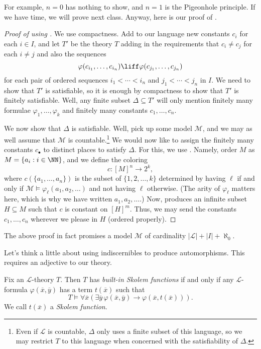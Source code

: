 \documentclass[../notes.tex]{subfiles}
\begin{document}
For example, $n=0$ has nothing to show, and $n=1$ is the Pigeonhole principle. If we have time, we will prove  next class. Anyway, here is our proof of .
\begin{proof}[Proof of  using ]
	We use compactness. Add to our language new constants $c_i$ for each $i\in I$, and let $T'$ be the theory $T$ adding in the requirements that $c_i\ne c_j$ for each $i\ne j$ and also the sequences
	\[\varphi(c_{i_1},\ldots,c_{i_n})\liff\varphi(c_{j_1},\ldots,c_{j_n})\]
	for each pair of ordered sequences $i_1<\cdots<i_n$ and $j_1<\cdots<j_n$ in $I$. We need to show that $T'$ is satisfiable, so it is enough by compactness to show that $T'$ is finitely satisfiable. Well, any finite subset $\Delta\subseteq T'$ will only mention finitely many formulae $\varphi_1,\ldots,\varphi_k$ and finitely many constants $c_1,\ldots,c_n$.

	We now show that $\Delta$ is satisfiable. Well, pick up some model $\mathcal M$, and we may as well assume that $\mathcal M$ is countable.\footnote{Even if $\mathcal L$ is countable, $\Delta$ only uses a finite subset of this language, so we may restrict $T$ to this language when concerned with the satisfiability of $\Delta$.} We would now like to assign the finitely many constants $c_\bullet$ to distinct places to satisfy $\Delta$. For this, we use . Namely, order $M$ as $M=\{a_i:i\in\NN\}$, and we define the coloring
	\[c\colon[M]^n\to 2^k,\]
	where $c(\{a_1,\ldots,a_n\})$ is the subset of $\{1,2,\ldots,k\}$ determined by having $\ell$ if and only if $\mathcal M\models\varphi_\ell(a_1,a_2,\ldots)$ and not having $\ell$ otherwise. (The arity of $\varphi_\ell$ matters here, which is why we have written $a_1,a_2,\ldots$.) Now,  produces an infinite subset $H\subseteq M$ such that $c$ is constant on $[H]^m$. Thus, we may send the constants $c_1,\ldots,c_n$ wherever we please in $H$ (ordered properly).
\end{proof}
\begin{remark}
	The above proof in fact promises a model $\mathcal M$ of cardinality $\left|\mathcal L\right|+\left|I\right|+\aleph_0$.
\end{remark}
Let's think a little about using indiscernibles to produce automorphisms. This requires an adjective to our theory.
\begin{definition}
	Fix an $\mathcal L$-theory $T$. Then $T$ has \textit{built-in Skolem functions} if and only if any $\mathcal L$-formula $\varphi(\overline x,\overline y)$ has a term $t(\overline x)$ such that
	\[T\models\forall\overline x(\exists\overline y\,\varphi(\overline x,\overline y)\to\varphi(\overline x,t(\overline x))).\]
	We call $t(\overline x)$ a \textit{Skolem function}.
\end{definition}
\end{document}
